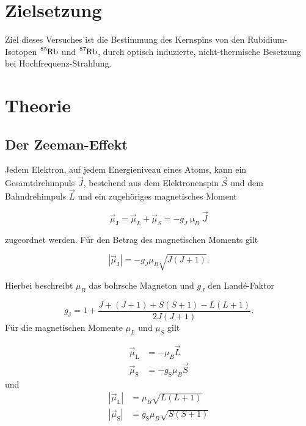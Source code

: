\section{Zielsetzung}
\label{sec:Ziel}

Ziel dieses Versuches ist die Bestimmung des Kernspins von den Rubidium-Isotopen $\ce{^{85}Rb}$ und $\ce{^{87}Rb}$, durch optisch induzierte,
nicht-thermische Besetzung bei Hochfrequenz-Strahlung.


\section{Theorie}
\label{sec:Theorie}

\subsection{Der Zeeman-Effekt}
\label{subsec:ZeemanEffekt}

Jedem Elektron, auf jedem Energieniveau eines Atoms, kann ein Gesamtdrehimpuls $\vec{J}$, bestehend aus dem Elektronenspin $\vec{S}$ und dem Bahndrehimpuls $\vec{L}$
und ein zugehöriges magnetisches Moment

\begin{equation}
    \vec{\mu}_\text{J} = \vec{\mu}_L+\vec{\mu}_S=-g_J\upmu_B\vec{J}
\end{equation}

\noindent
zugeordnet werden. Für den Betrag des magnetischen Moments gilt

\begin{equation}
  |\vec{\mu}_\text{J}| = -g_J\mu_B\sqrt{J(J+1)}.
\end{equation}

\noindent
Hierbei beschreibt $\mu_B$ das bohrsche Magneton und $g_J$ den Landé-Faktor

\begin{equation}
  g_\text{J} = 1+\frac{J+(J+1)+S(S+1)-L(L+1)}{2J(J+1)}.
  \label{eq:gj}
\end{equation}
\noindent
Für die magnetischen Momente $\mu_L$ und $\mu_S$ gilt

\begin{align}
    \vec{\mu}_\text{L} &= -\mu_B\vec{L} \\
    \vec{\mu}_\text{S} &= -g_\text{S}\mu_B\vec{S}
\end{align}
\noindent
und
\begin{align}
    |\vec{\mu}_\text{L}| &= \mu_B\sqrt{L(L+1)} \\
    |\vec{\mu}_\text{S}| &= g_\text{S}\mu_B\sqrt{S(S+1)}
\end{align}

